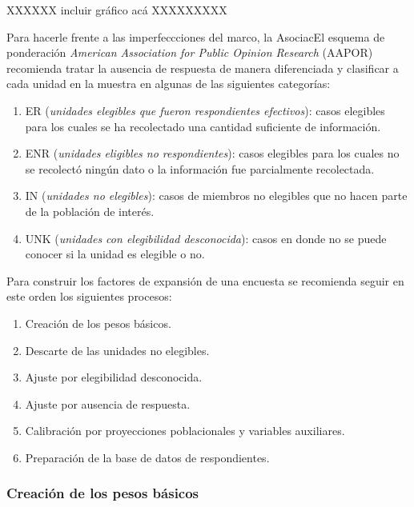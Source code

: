 \documentclass[12pt,spanish,]{book}
\providecommand{\tightlist}{%
  \setlength{\itemsep}{0pt}\setlength{\parskip}{0pt}}
\begin{document}
XXXXXX incluir gráfico acá XXXXXXXXX

Para hacerle frente a las imperfeccciones del marco, la AsociacEl esquema de ponderación \emph{American Association for Public Opinion Research} (AAPOR) recomienda tratar la ausencia de respuesta de manera diferenciada y clasificar a cada unidad en la muestra en algunas de las siguientes categorías:

\begin{enumerate}
\def\labelenumi{\arabic{enumi}.}
\tightlist
\item
  ER (\emph{unidades elegibles que fueron respondientes efectivos}): casos elegibles para los cuales se ha recolectado una cantidad suficiente de información.
\item
  ENR (\emph{unidades eligibles no respondientes}): casos elegibles para los cuales no se recolectó ningún dato o la información fue parcialmente recolectada.
\item
  IN (\emph{unidades no elegibles}): casos de miembros no elegibles que no hacen parte de la población de interés.
\item
  UNK (\emph{unidades con elegibilidad desconocida}): casos en donde no se puede conocer si la unidad es elegible o no.
\end{enumerate}

Para construir los factores de expansión de una encuesta se recomienda seguir en este orden los siguientes procesos:

\begin{enumerate}
\def\labelenumi{\arabic{enumi}.}
\tightlist
\item
  Creación de los pesos básicos.
\item
  Descarte de las unidades no elegibles.
\item
  Ajuste por elegibilidad desconocida.
\item
  Ajuste por ausencia de respuesta.
\item
  Calibración por proyecciones poblacionales y variables auxiliares.
\item
  Preparación de la base de datos de respondientes.
\end{enumerate}

\hypertarget{creacion-de-los-pesos-basicos}{%
\subsubsection*{Creación de los pesos básicos}\label{creacion-de-los-pesos-basicos}}
\end{document}
